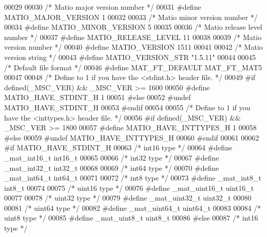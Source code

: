 \begin{DoxyCode}
00029 
00030 \textcolor{comment}{/* Matio major version number */}
00031 \textcolor{preprocessor}{#define MATIO\_MAJOR\_VERSION 1}
00032 
00033 \textcolor{comment}{/* Matio minor version number */}
00034 \textcolor{preprocessor}{#define MATIO\_MINOR\_VERSION 5}
00035 
00036 \textcolor{comment}{/* Matio release level number */}
00037 \textcolor{preprocessor}{#define MATIO\_RELEASE\_LEVEL 11}
00038 
00039 \textcolor{comment}{/* Matio version number */}
00040 \textcolor{preprocessor}{#define MATIO\_VERSION 1511}
00041 
00042 \textcolor{comment}{/* Matio version string */}
00043 \textcolor{preprocessor}{#define MATIO\_VERSION\_STR "1.5.11"}
00044 
00045 \textcolor{comment}{/* Default file format */}
00046 \textcolor{preprocessor}{#define MAT\_FT\_DEFAULT MAT\_FT\_MAT5}
00047 
00048 \textcolor{comment}{/* Define to 1 if you have the <stdint.h> header file. */}
00049 \textcolor{preprocessor}{#if defined(\_MSC\_VER) && \_MSC\_VER >= 1600}
00050 \textcolor{preprocessor}{#define MATIO\_HAVE\_STDINT\_H 1}
00051 \textcolor{preprocessor}{#else}
00052 \textcolor{preprocessor}{#undef MATIO\_HAVE\_STDINT\_H}
00053 \textcolor{preprocessor}{#endif}
00054 
00055 \textcolor{comment}{/* Define to 1 if you have the <inttypes.h> header file. */}
00056 \textcolor{preprocessor}{#if defined(\_MSC\_VER) && \_MSC\_VER >= 1800}
00057 \textcolor{preprocessor}{#define MATIO\_HAVE\_INTTYPES\_H 1}
00058 \textcolor{preprocessor}{#else}
00059 \textcolor{preprocessor}{#undef MATIO\_HAVE\_INTTYPES\_H}
00060 \textcolor{preprocessor}{#endif}
00061 
00062 \textcolor{preprocessor}{#if MATIO\_HAVE\_STDINT\_H}
00063 \textcolor{comment}{/* int16 type */}
00064 \textcolor{preprocessor}{#define \_mat\_int16\_t int16\_t}
00065 
00066 \textcolor{comment}{/* int32 type */}
00067 \textcolor{preprocessor}{#define \_mat\_int32\_t int32\_t}
00068 
00069 \textcolor{comment}{/* int64 type */}
00070 \textcolor{preprocessor}{#define \_mat\_int64\_t int64\_t}
00071 
00072 \textcolor{comment}{/* int8 type */}
00073 \textcolor{preprocessor}{#define \_mat\_int8\_t int8\_t}
00074 
00075 \textcolor{comment}{/* uint16 type */}
00076 \textcolor{preprocessor}{#define \_mat\_uint16\_t uint16\_t}
00077 
00078 \textcolor{comment}{/* uint32 type */}
00079 \textcolor{preprocessor}{#define \_mat\_uint32\_t uint32\_t}
00080 
00081 \textcolor{comment}{/* uint64 type */}
00082 \textcolor{preprocessor}{#define \_mat\_uint64\_t uint64\_t}
00083 
00084 \textcolor{comment}{/* uint8 type */}
00085 \textcolor{preprocessor}{#define \_mat\_uint8\_t uint8\_t}
00086 \textcolor{preprocessor}{#else}
00087 \textcolor{comment}{/* int16 type */}

\end{DoxyCode}

